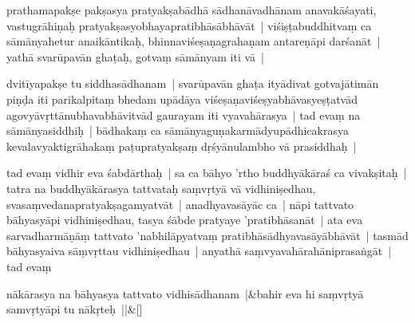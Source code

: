 \documentclass[article,12pt,a4paper]{memoir}%
\newcounter{parCount}
\begin{document}
	  \pstart \leavevmode%
	\label{thakur75-65.6} prathamapakṣe pakṣasya pratyakṣabādhā sādhanāvadhānam anavakāśayati, vastugrāhiṇaḥ pratyakṣasyobhayapratibhāsābhāvāt | viśiṣṭabuddhitvaṃ ca sāmānyahetur anaikāntikaḥ, bhinnaviśeṣaṇagrahaṇam antareṇāpi darśanāt | yathā svarūpavān ghaṭaḥ, gotvaṃ sāmānyam iti vā |
	{}
	\pend%
      

	  \pstart \leavevmode%
	\label{thakur75-65.10} dvitīyapakṣe tu siddhasādhanam | svarūpavān ghaṭa ityādivat gotvajātimān piṇḍa iti parikalpitaṃ bhedam upādāya viśeṣaṇaviśeṣyabhāvasyeṣṭatvād agovyāvṛttānubhavabhāvitvād gaurayam iti vyavahārasya | tad evaṃ na sāmānyasiddhiḥ | bādhakaṃ ca sāmānyaguṇakarmādyupādhicakrasya kevalavyaktigrāhakaṃ paṭupratyakṣaṃ dṛśyānulambho vā prasiddhaḥ |
	{}
	\pend%
      

	  \pstart \leavevmode%
	\label{thakur75-65.15} tad evaṃ vidhir eva śabdārthaḥ | sa ca bāhyo 'rtho buddhyākāraś ca vivakṣitaḥ | tatra na buddhyākārasya tattvataḥ saṃvṛtyā vā vidhiniṣedhau, svasaṃvedanapratyakṣagamyatvāt | anadhyavasāyāc ca | nāpi tattvato bāhyasyāpi vidhiniṣedhau, tasya śābde pratyaye 'pratibhāsanāt | ata eva sarvadharmāṇāṃ tattvato 'nabhilāpyatvaṃ pratibhāsādhyavasāyābhāvāt | tasmād bāhyasyaiva sāṃvṛttau vidhiniṣedhau | anyathā saṃvyavahārahāniprasaṅgāt | tad evaṃ
	{}
	\pend%
      
	    
	    \stanza[\smallbreak]
	  \label{thakur75-65.21}nākārasya na bāhyasya tattvato vidhisādhanam |&bahir eva hi saṃvṛtyā samvṛtyāpi tu nākṛteḥ ||\&[\smallbreak]
	  
	  
	  
\end{document}
